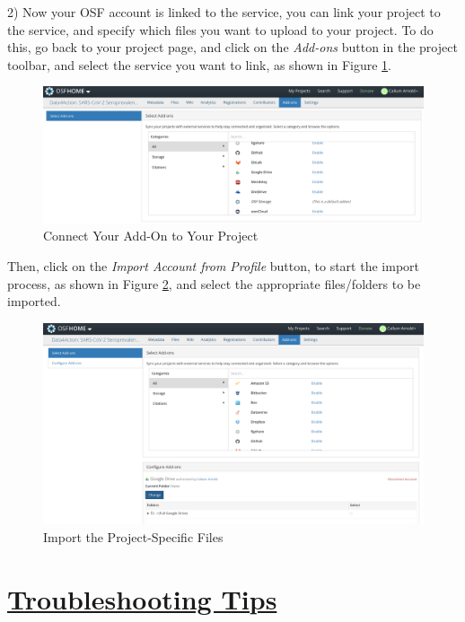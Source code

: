 \documentclass{scrartcl}
\begin{document}
2) Now your OSF account is linked to the service, you can link your project to the service, and specify which files you want to upload to your project.
To do this, go back to your project page, and click on the \emph{Add-ons} button in the project toolbar, and select the service you want to link, as shown in Figure \ref{fig:addons-project-01}.

\begin{figure}[!htb]
    \centering
    \includegraphics[width=\textwidth]{addons-project-01.png}
    \caption{Connect Your Add-On to Your Project}
    \label{fig:addons-project-01}
\end{figure}

Then, click on the \emph{Import Account from Profile} button, to start the import process, as shown in Figure \ref{fig:addons-project-02}, and select the appropriate files/folders to be imported.

\begin{figure}[!htb]
    \centering
    \includegraphics[width=\textwidth]{addons-project-02.png}
    \caption{Import the Project-Specific Files}
    \label{fig:addons-project-02}
\end{figure}

\section{\underline{Troubleshooting Tips}}
\end{document}
